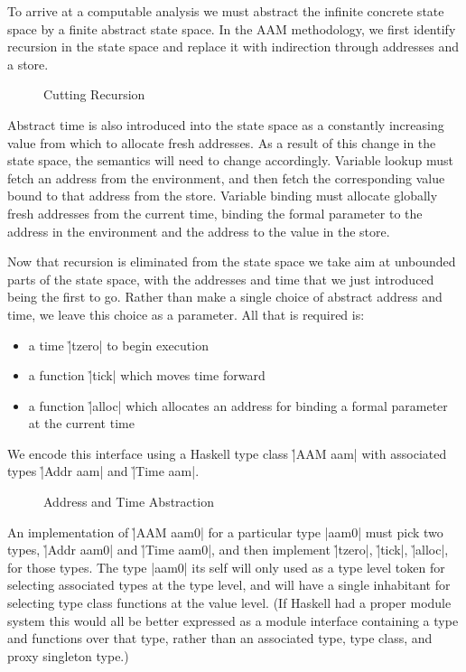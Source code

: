 
To arrive at a computable analysis we must abstract the infinite concrete state
space by a finite abstract state space.
%
In the AAM methodology, we first identify recursion in the state space and
replace it with indirection through addresses and a store.
%
\begin{figure}[H]
\caption*{Cutting Recursion}
\end{figure} 
\noindent
%
Abstract time is also introduced into the state space as a constantly
increasing value from which to allocate fresh addresses.
%
As a result of this change in the state space, the semantics will need to
change accordingly.
%
Variable lookup must fetch an address from the environment, and then fetch the
corresponding value bound to that address from the store.
%
Variable binding must allocate globally fresh addresses from the current time,
binding the formal parameter to the address in the environment and the address
to the value in the store.


Now that recursion is eliminated from the state space we take aim at unbounded
parts of the state space, with the addresses and time that we just introduced
being the first to go.
%
Rather than make a single choice of abstract address and time, we leave this
choice as a parameter.
%
All that is required is:
\begin{itemize}
\item a time \h|tzero| to begin execution
\item a function \h|tick| which moves time forward
\item a function \h|alloc| which allocates an address for binding a formal
      parameter at the current time
\end{itemize}
%
We encode this interface using a Haskell type class \h|AAM aam| with associated
types \h|Addr aam| and \h|Time aam|.
%
\begin{figure}[H]
\caption*{Address and Time Abstraction}
\end{figure}
\noindent
%
An implementation of \h|AAM aam0| for a particular type \p|aam0| must pick two
types, \h|Addr aam0| and \h|Time aam0|, and then implement \h|tzero|, \h|tick|,
\h|alloc|, for those types.
%
The type |aam0| its self will only used as a type level token for selecting
associated types at the type level, and will have a single inhabitant for
selecting type class functions at the value level.
%
(If Haskell had a proper module system this would all be better expressed as a
module interface containing a type and functions over that type, rather than an
associated type, type class, and proxy singleton type.)

